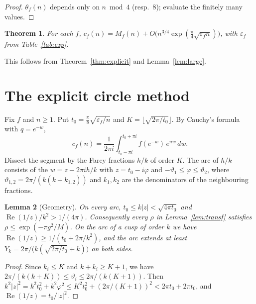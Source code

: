 \documentclass[11pt]{amsart}
\newtheorem{theorem}{Theorem}[section]
\newtheorem{lemma}[theorem]{Lemma}
\theoremstyle{definition}
\theoremstyle{remark}
\numberwithin{equation}{section}
\newcommand{\re}{\operatorname{Re}}
\begin{document}
\begin{proof}
$\theta_f(n)$ depends only on $n\bmod 4$ (resp.\ $8$); evaluate the finitely many values.
\end{proof}

\begin{theorem}\label{thm:asym}
For each $f$, $c_f(n)=M_f(n)+O\big(n^{3/4}\exp(\tfrac\pi4\sqrt{\varepsilon_f n})\big)$, with $\varepsilon_f$ from Table~\ref{tab:exp}.
\end{theorem}

This follows from Theorem~\ref{thm:explicit} and Lemma~\ref{lem:large}.

\section{The explicit circle method}\label{sec:circle}

Fix $f$ and $n\ge1$.
Put $t_0=\frac\pi8\sqrt{\varepsilon_f/n}$ and $K=\lfloor\sqrt{2\pi/t_0}\rfloor$.
By Cauchy's formula with $q=e^{-w}$,
\[
c_f(n)=\frac1{2\pi i}\int_{t_0-\pi i}^{t_0+\pi i}f(e^{-w})\,e^{nw}\,dw.
\]
Dissect the segment by the Farey fractions $h/k$ of order $K$.
The arc of $h/k$ consists of the $w=z-2\pi ih/k$ with $z=t_0-i\varphi$ and $-\vartheta_1\le\varphi\le\vartheta_2$, where $\vartheta_{1,2}=2\pi/(k(k+k_{1,2}))$ and $k_1,k_2$ are the denominators of the neighbouring fractions.

\begin{lemma}[Geometry]\label{lem:geom}
On every arc, $t_0\le k|z|<\sqrt{4\pi t_0}$ and $\re(1/z)/k^2>1/(4\pi)$.
Consequently every $\rho$ in Lemma~\ref{lem:transf} satisfies $\rho\le\exp(-\pi g^2/M)$.
On the arc of a cusp of order $k$ we have $\re(1/z)\ge1/(t_0+2\pi/k^2)$, and the arc extends at least $Y_k=2\pi/\big(k(\sqrt{2\pi/t_0}+k)\big)$ on both sides.
\end{lemma}

\begin{proof}
Since $k_i\le K$ and $k+k_i\ge K+1$, we have $2\pi/(k(k+K))\le\vartheta_i\le2\pi/(k(K+1))$.
Then $k^2|z|^2=k^2t_0^2+k^2\varphi^2\le K^2t_0^2+(2\pi/(K+1))^2<2\pi t_0+2\pi t_0$, and $\re(1/z)=t_0/|z|^2$.
\end{proof}
\end{document}
